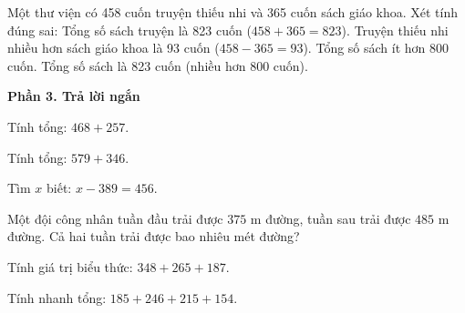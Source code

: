 \begin{ex} %
Một thư viện có 458 cuốn truyện thiếu nhi và 365 cuốn sách giáo khoa. Xét tính đúng sai:
\choiceTF
{\True Tổng số sách truyện là 823 cuốn ($458 + 365 = 823$).}
{\True Truyện thiếu nhi nhiều hơn sách giáo khoa là 93 cuốn ($458 - 365 = 93$).}
{Tổng số sách ít hơn 800 cuốn.}
{\True Tổng số sách là 823 cuốn (nhiều hơn 800 cuốn).}
\end{ex}

\textbf{Phần 3. Trả lời ngắn}

\begin{ex} %
Tính tổng: $468 + 257$.
\end{ex}

\begin{ex} %
Tính tổng: $579 + 346$.
\end{ex}

\begin{ex} %
Tìm $x$ biết: $x - 389 = 456$.
\end{ex}

\begin{ex} %
Một đội công nhân tuần đầu trải được $375\text{ m}$ đường, tuần sau trải được $485\text{ m}$ đường. Cả hai tuần trải được bao nhiêu mét đường?
\end{ex}

\begin{ex} %
Tính giá trị biểu thức: $348 + 265 + 187$.
\end{ex}

\begin{ex} %
Tính nhanh tổng: $185 + 246 + 215 + 154$.
\end{ex}

